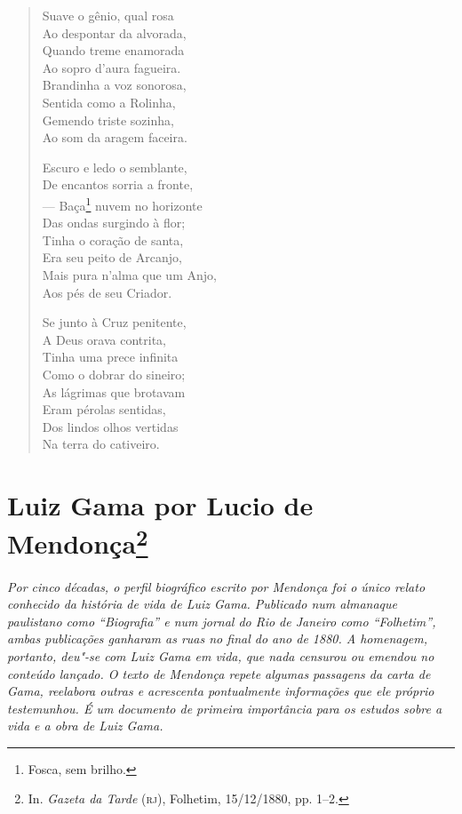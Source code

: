 \begin{verse}
Suave o gênio, qual rosa\\
Ao despontar da alvorada,\\
Quando treme enamorada\\
Ao sopro d'aura fagueira.\\
Brandinha a voz sonorosa,\\
Sentida como a Rolinha,\\
Gemendo triste sozinha,\\
Ao som da aragem faceira.

Escuro e ledo o semblante,\\
De encantos sorria a fronte,\\
--- Baça\footnote{Fosca, sem brilho.} nuvem no horizonte\\
Das ondas surgindo à flor;\\
Tinha o coração de santa,\\
Era seu peito de Arcanjo,\\
Mais pura n'alma que um Anjo,\\
Aos pés de seu Criador.

Se junto à Cruz penitente,\\
A Deus orava contrita,\\
Tinha uma prece infinita\\
Como o dobrar do sineiro;\\
As lágrimas que brotavam\\
Eram pérolas sentidas,\\
Dos lindos olhos vertidas\\
Na terra do cativeiro.
\end{verse}



\chapter{Luiz Gama por Lucio de Mendonça\footnote[*]{In.
  \emph{Gazeta da Tarde} (\textsc{rj}), Folhetim, 15/12/1880, pp. 1--2.}}

\begin{flushleft}
{\footnotesize\itshape
Por cinco décadas, o perfil biográfico escrito por Mendonça foi o
único relato conhecido da história de vida de Luiz Gama. Publicado num
almanaque paulistano como ``Biografia'' e num jornal do Rio de Janeiro
como ``Folhetim'', ambas publicações ganharam as ruas no final do ano de
1880. A homenagem, portanto, deu"-se com Luiz Gama em vida, que nada
censurou ou emendou no conteúdo lançado. O texto de Mendonça repete
algumas passagens da carta de Gama, reelabora outras e acrescenta
pontualmente informações que ele próprio testemunhou. É um documento de
primeira importância para os estudos sobre a vida e a obra de Luiz Gama.
}
\end{flushleft}

